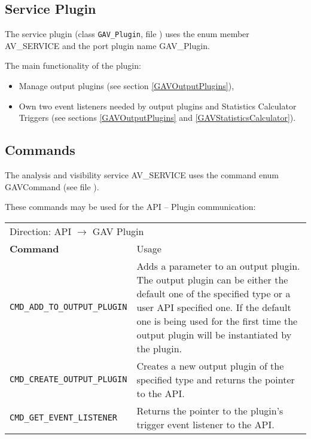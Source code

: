 \subsection{Service Plugin}
\label{GAVServicePlugin}

The service plugin (class \lstinline|GAV_Plugin|, file ) uses the enum member {\sffamily AV\_SERVICE} and the port plugin name {\sffamily GAV\_Plugin}.

The main functionality of the plugin:
\begin{itemize}
  \item  Manage output plugins (see section \ref{GAVOutputPlugins}),
  \item  Own two event listeners needed by output plugins and Statistics Calculator Triggers (see sections \ref{GAVOutputPlugins} and \ref{GAVStatisticsCalculator}).
\end{itemize}



\subsection{Commands}
\label{GAVCommands}

The analysis and visibility service {\sffamily AV\_SERVICE} uses the command enum {\sffamily GAVCommand} (see file ).

These commands may be used for the API -- Plugin communication:

\noindent
\begin{tabularx}{\textwidth}{|p{5.1cm}|X|}
	\cline{1-1}\cline{2-2}\multicolumn{2}{|l|}{  Direction:  \newline API $\rightarrow$ GAV Plugin    }\\ 
	\cline{1-1}\cline{2-2} {\bf Command}    &  Usage   \\ 
	\cline{1-1}\cline{2-2} \lstinline|CMD_ADD_TO_OUTPUT_PLUGIN|    &   
		Adds a parameter to an output plugin. The output plugin can be either the default one of the 
		specified type or a user API specified one. If the default one is being used for the first time 
		the output plugin will be instantiated by the plugin. \\ 
	\cline{1-1}\cline{2-2} \lstinline|CMD_CREATE_OUTPUT_PLUGIN|    &   
		Creates a new output plugin of the specified type and returns the pointer to the API.  \\ 
	\cline{1-1}\cline{2-2} \lstinline|CMD_GET_EVENT_LISTENER|    &   
		Returns the pointer to the plugin's trigger event listener to the API.  \\ 
	\hline
\end{tabularx}

